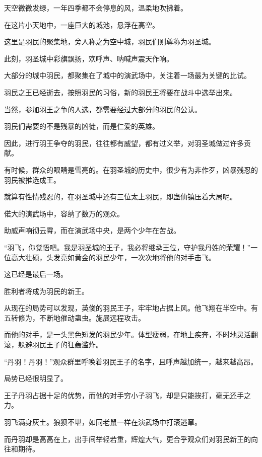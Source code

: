 
\begin{this_body}



天空微微发绿，一年四季都不会停息的风，温柔地吹拂着。

在这片小天地中，一座巨大的城池，悬浮在高空。

这里是羽民的聚集地，旁人称之为空中城，羽民们则尊称为羽圣城。

此刻，羽圣城中彩旗飘扬，欢呼声、呐喊声震天作响。

大部分的城中羽民，都聚集在了城中的演武场中，关注着一场最为关键的比试。

羽民之王已经逝去，按照羽民的习俗，新的羽民王将要在战斗中选举出来。

当然，参加羽王之争的人选，都需要经过大部分的羽民的公认。

羽民们需要的不是残暴的凶徒，而是仁爱的英雄。

因此，进行羽王争夺的羽民，往往都有威望，都有过义举，对羽圣城做过许多贡献。

有时候，群众的眼睛是雪亮的。在羽圣城的历史中，很少有为非作歹，凶暴残忍的羽民被推选成王。

就算有性情残忍的，在羽圣城中还有三位太上羽民，即蛊仙镇压着大局呢。

偌大的演武场中，容纳了数万的观众。

助威声响彻云霄，而在演武场中央，是两个少年在苦战。

“羽飞，你觉悟吧。我是羽圣城的王子，我必将继承王位，守护我丹姓的荣耀！”一位高大壮硕，头发亮如黄金的羽民少年，一次次地将他的对手击飞。

这已经是最后一场。

胜利者将成为羽民的新王。

从现在的局势可以发现，英俊的羽民王子，牢牢地占据上风。他飞翔在半空中。有五转修为，不断地催动蛊虫。施展远程攻击。

而他的对手，是一头黑色短发的羽民少年。体型瘦弱，在地上疾奔，不时地灵活翻滚，躲避羽民王子的狂轰滥炸。

“丹羽！丹羽！”观众群里呼唤着羽民王子的名字，且呼声越加统一，越来越高昂。

局势已经很明显了。

王子丹羽占据十足的优势，而他的对手穷小子羽飞，却是只能挨打，毫无还手之力。

羽飞满身灰土。狼狈不堪，如同老鼠一样在演武场中打滚逃窜。

而丹羽却是高高在上，出手间举轻若重，辉煌大气，更合乎观众们对羽民新王的向往和期待。


\end{this_body}
